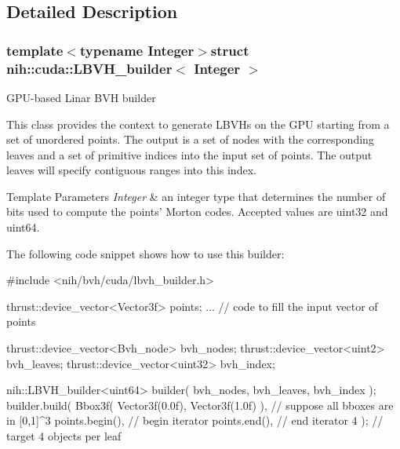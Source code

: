 \subsection{\-Detailed \-Description}
\subsubsection*{template$<$typename Integer$>$struct nih\-::cuda\-::\-L\-B\-V\-H\-\_\-builder$<$ Integer $>$}

\-G\-P\-U-\/based \-Linar \-B\-V\-H builder

\-This class provides the context to generate \-L\-B\-V\-Hs on the \-G\-P\-U starting from a set of unordered points. \-The output is a set of nodes with the corresponding leaves and a set of primitive indices into the input set of points. \-The output leaves will specify contiguous ranges into this index.


\begin{DoxyTemplParams}{\-Template Parameters}
{\em \-Integer} & an integer type that determines the number of bits used to compute the points' \-Morton codes. \-Accepted values are uint32 and uint64.\\
\hline
\end{DoxyTemplParams}
\-The following code snippet shows how to use this builder\-:


\begin{DoxyCode}
 #include <nih/bvh/cuda/lbvh_builder.h>

 thrust::device_vector<Vector3f> points;
 ... // code to fill the input vector of points

 thrust::device_vector<Bvh_node> bvh_nodes;
 thrust::device_vector<uint2>    bvh_leaves;
 thrust::device_vector<uint32>   bvh_index;

 nih::LBVH_builder<uint64> builder( bvh_nodes, bvh_leaves, bvh_index );
 builder.build(
     Bbox3f( Vector3f(0.0f), Vector3f(1.0f) ),   // suppose all bboxes are in
       [0,1]^3
     points.begin(),                             // begin iterator
     points.end(),                               // end iterator
     4 );                                        // target 4 objects per leaf
\end{DoxyCode}
 

